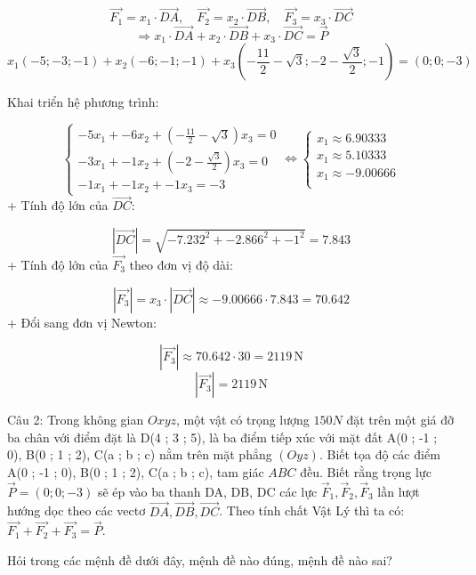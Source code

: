 \documentclass[a4paper,12pt]{article}
\begin{document}
\[ \overrightarrow{F_1} = x_1 \cdot \overrightarrow{DA},\quad \overrightarrow{F_2} = x_2 \cdot \overrightarrow{DB},\quad \overrightarrow{F_3} = x_3 \cdot \overrightarrow{DC} \]
\[ \Rightarrow x_1 \cdot \overrightarrow{DA} + x_2 \cdot \overrightarrow{DB} + x_3 \cdot \overrightarrow{DC} = \overrightarrow{P} \]
\[ x_1(-5; -3; -1) + x_2(-6; -1; -1) + x_3(- \frac{11}{2} - \sqrt{3}; -2 - \frac{\sqrt{3}}{2}; -1) = (0; 0; -3) \]


Khai triển hệ phương trình:


\[
\begin{cases}
-5x_1 + -6x_2 + \left(- \frac{11}{2} - \sqrt{3}\right)x_3 = 0 \\
-3x_1 + -1x_2 + \left(-2 - \frac{\sqrt{3}}{2}\right)x_3 = 0 \\
-1x_1 + -1x_2 + -1x_3 = -3
\end{cases}
\Leftrightarrow
\begin{cases}
x_1 \approx 6.90333 \\
x_1 \approx 5.10333 \\
x_1 \approx -9.00666 \\
\end{cases}
\]
+ Tính độ lớn của \(\overrightarrow{DC}\):


\[ |\overrightarrow{DC}| = \sqrt{-7.232^2 + -2.866^2 + -1^2} = 7.843 \]
+ Tính độ lớn của \(\overrightarrow{F_3}\) theo đơn vị độ dài:


\[ |\overrightarrow{F_3}| = x_3 \cdot |\overrightarrow{DC}| \approx -9.00666 \cdot 7.843 = 70.642 \]
+ Đổi sang đơn vị Newton:


\[ |\overrightarrow{F_3}| \approx 70.642 \cdot 30 = 2119\,\mathrm{N} \]
\[|\overrightarrow{F_3}| = 2119\,\mathrm{N}\]



Câu 2: Trong không gian \(Oxyz\), một vật có trọng lượng \(150N\) đặt trên một giá đỡ ba chân với điểm đặt là D(4 ; 3 ; 5), là ba điểm tiếp xúc với mặt đất A(0 ; -1 ; 0), B(0 ; 1 ; 2), C(a ; b ; c) nằm trên mặt phẳng \((O y z )\). Biết tọa độ các điểm A(0 ; -1 ; 0), B(0 ; 1 ; 2), C(a ; b ; c), tam giác \(ABC\) đều. Biết rằng trọng lực \(\overrightarrow{P}=(0 ; 0 ; -3)\) sẽ ép vào ba thanh DA, DB, DC các lực \(\overrightarrow{F}_1, \overrightarrow{F}_2, \overrightarrow{F}_3\) lần lượt hướng dọc theo các vectơ \(\overrightarrow{DA}, \overrightarrow{DB}, \overrightarrow{DC}\). Theo tính chất Vật Lý thì ta có: \(\overrightarrow{F_1}+\overrightarrow{F_2}+\overrightarrow{F_3}=\overrightarrow{P}\).

Hỏi trong các mệnh đề dưới đây, mệnh đề nào đúng, mệnh đề nào sai?
\end{document}

